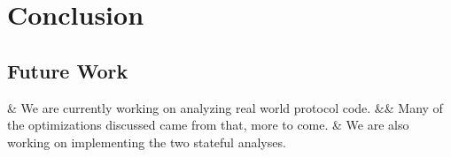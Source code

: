 \section{Conclusion}
\label{sec:conclusion}

\subsection{Future Work}
\label{sec:future}

\begin{easylist}[itemize]
	& We are currently working on analyzing real world protocol code.
	&& Many of the optimizations discussed came from that, more to come.
	& We are also working on implementing the two stateful analyses.
\end{easylist}